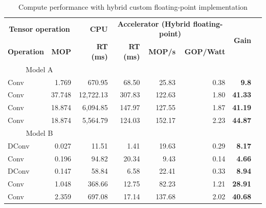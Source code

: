 \begin{table}[!htp]\centering
	\caption{Compute performance with hybrid custom floating-point implementation}\label{tab:performace_float_hybrid }
	\scriptsize
	\begin{tabular}{lrrrrrrr}\toprule
		\multicolumn{2}{c}{\textbf{Tensor operation}} &\textbf{CPU} &\multicolumn{3}{c}{\textbf{Accelerator (Hybrid floating-point)}} &\multirow{2}{*}{\textbf{Gain}} \\\cmidrule{1-6}
		\textbf{Operation} &\textbf{MOP} &\textbf{RT (ms)} &\textbf{RT (ms)} &\textbf{MOP/s} &\textbf{GOP/Watt} & \\\midrule
		\multicolumn{2}{c}{Model A} & & & & & \\
		Conv &1.769 &670.95 &68.50 &25.83 &0.38 &\textbf{9.8} \\
		Conv &37.748 &12,722.13 &307.83 &122.63 &1.80 &\textbf{41.33} \\
		Conv &18.874 &6,094.85 &147.97 &127.55 &1.87 &\textbf{41.19} \\
		Conv &18.874 &5,564.79 &124.03 &152.17 &2.23 &\textbf{44.87} \\
		\multicolumn{2}{c}{Model B} & & & & & \\
		DConv &0.027 &11.51 &1.41 &19.63 &0.29 &\textbf{8.17} \\
		Conv &0.196 &94.82 &20.34 &9.43 &0.14 &\textbf{4.66} \\
		DConv &0.147 &58.84 &6.58 &22.41 &0.33 &\textbf{8.94} \\
		Conv &1.048 &368.66 &12.75 &82.23 &1.21 &\textbf{28.91} \\
		Conv &2.359 &697.08 &17.14 &137.68 &2.02 &\textbf{40.68} \\
		\bottomrule
	\end{tabular}
\end{table}

